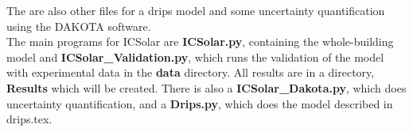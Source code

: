 \documentclass[11pt]{article}
\begin{document}
The are also other files for a drips model and some uncertainty quantification using the DAKOTA software. \\

The main programs for ICSolar are {\bf ICSolar.py}, containing the whole-building model and {\bf ICSolar\_Validation.py}, which runs the validation of the model with experimental data in the {\bf data} directory. All results are in a directory, {\bf Results} which will be created. There is also a {\bf ICSolar\_Dakota.py}, which does uncertainty quantification, and a {\bf Drips.py}, which does the model described in drips.tex.
\end{document}
